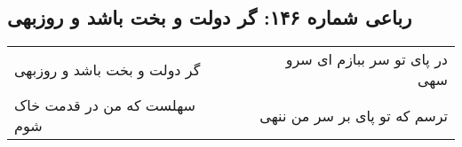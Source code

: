 \begin{center}
\section*{رباعی شماره ۱۴۶: گر دولت و بخت باشد و روزبهی}
\label{sec:146}
\begin{longtable}{l p{0.5cm} r}
گر دولت و بخت باشد و روزبهی
&&
در پای تو سر ببازم ای سرو سهی
\\
سهلست که من در قدمت خاک شوم
&&
ترسم که تو پای بر سر من ننهی
\\
\end{longtable}
\end{center}
